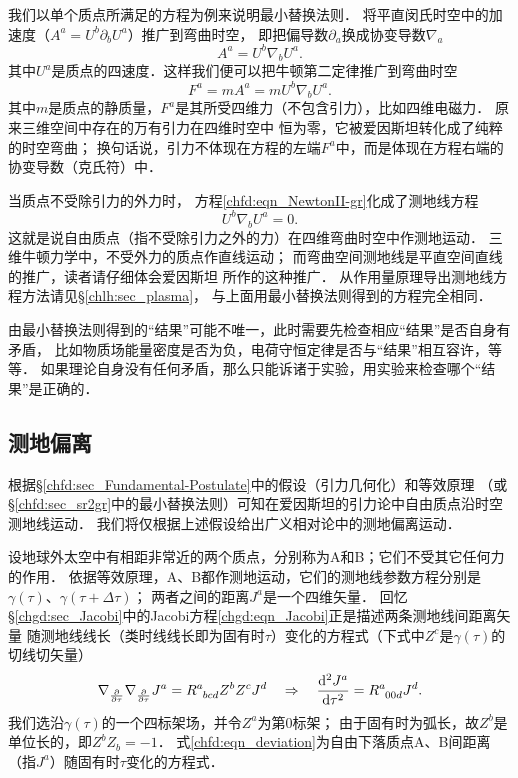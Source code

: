 我们以单个质点所满足的方程为例来说明最小替换法则．
将平直闵氏时空中的加速度（$A^a = U^b \partial_b U^a$）推广到弯曲时空，
即把偏导数$\partial_a$换成协变导数$\nabla_a$
\begin{equation}
    A^a = U^b \nabla_b U^a .
\end{equation}
其中$U^a$是质点的四速度．这样我们便可以把牛顿第二定律推广到弯曲时空
\begin{equation}\label{chfd:eqn_NewtonII-gr}
    F^a = m A^a = m U^b \nabla_b U^a .
\end{equation}
其中$m$是质点的静质量，$F^a$是其所受四维力（不包含引力），比如四维电磁力．
{\kaishu 原来三维空间中存在的万有引力在四维时空中
    {\heiti 恒为零}，它被爱因斯坦转化成了纯粹的时空弯曲；
    换句话说，引力不体现在方程的左端$F^a$中，而是体现在方程右端的协变导数（克氏符）中．}

当质点不受除引力的外力时，
方程\eqref{chfd:eqn_NewtonII-gr}化成了测地线方程
\begin{equation}\label{chfd:eqn_geodesic-gr}
    U^b \nabla_b U^a =0.
\end{equation}
这就是说自由质点（指不受除引力之外的力）在四维弯曲时空中作测地运动．
三维牛顿力学中，不受外力的质点作直线运动；
而弯曲空间测地线是平直空间直线的推广，读者请仔细体会爱因斯坦
所作的这种推广．
从作用量原理导出测地线方程方法请见\S \ref{chlh:sec_plasma}，
与上面用最小替换法则得到的方程完全相同．





由最小替换法则得到的“结果”可能不唯一，此时需要先检查相应“结果”是否自身有矛盾，
比如物质场能量密度是否为负，电荷守恒定律是否与“结果”相互容许，等等．
如果理论自身没有任何矛盾，那么只能诉诸于实验，用实验来检查哪个“结果”是正确的．


\subsection{测地偏离}\label{chfd:sec_GDTF}
根据\S\ref{chfd:sec_Fundamental-Postulate}中的假设（引力几何化）和等效原理
（或\S\ref{chfd:sec_sr2gr}中的最小替换法则）可知在爱因斯坦的引力论中自由质点沿时空测地线运动．
我们将仅根据上述假设给出广义相对论中的测地偏离运动．


设地球外太空中有相距非常近的两个质点，分别称为A和B；它们不受其它任何力的作用．
依据等效原理，A、B都作测地运动，它们的测地线参数方程分别是$\gamma(\tau)$、$\gamma(\tau+\Delta\tau)$；
两者之间的距离$J^a$是一个四维矢量．
回忆\S\ref{chgd:sec_Jacobi}中的Jacobi方程\eqref{chgd:eqn_Jacobi}正是描述两条测地线间距离矢量
随测地线线长（类时线线长即为固有时$\tau$）变化的方程式（下式中$Z^c$是$\gamma(\tau)$的切线切矢量）
\begin{equation}\label{chfd:eqn_deviation}
	\nabla_{\frac{\partial}{\partial \tau}} \nabla_{\frac{\partial}{\partial \tau}}{J}^a 
	=R^{a}_{\hphantom{a} bcd} {Z}^b {Z}^c{J}^d 
	\quad \Rightarrow \quad
	\frac{{\rm d}^2 J^a}{{\rm d} \tau^2}=R^{a}_{\hphantom{a} 00d} {J}^d. 
\end{equation}
我们选沿$\gamma(\tau)$的一个四标架场，并令$Z^a$为第$0$标架；
由于固有时为弧长，故$Z^b$是单位长的，即$Z^b Z_b=-1$．
式\eqref{chfd:eqn_deviation}为自由下落质点A、B间距离（指$J^a$）随固有时$\tau$变化的方程式．



